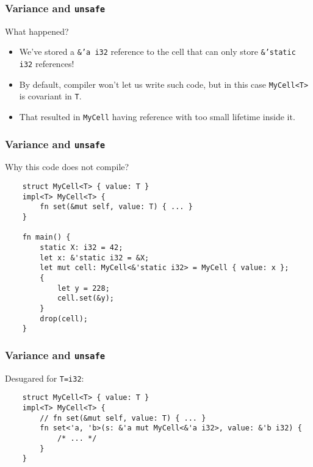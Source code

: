 \documentclass[aspectratio=1610,t]{beamer}
\begin{document}

\begin{frame}[fragile]
\frametitle{Variance and \texttt{unsafe}}
What happened?

\begin{itemize}
    \item<2-> We've stored a \texttt{\&'a i32} reference to the cell that can only store \texttt{\&'static i32} references!
    \item<3-> By default, compiler won't let us write such code, but in this case \texttt{MyCell<T>} is covariant in \texttt{T}.
    \item<4-> That resulted in \texttt{MyCell} having reference with too small lifetime inside it.
\end{itemize}
\end{frame}


\begin{frame}[fragile]
\frametitle{Variance and \texttt{unsafe}}
Why this code does not compile?

\begin{verbatim}
    struct MyCell<T> { value: T }
    impl<T> MyCell<T> {
        fn set(&mut self, value: T) { ... }
    }

    fn main() {
        static X: i32 = 42;
        let x: &'static i32 = &X;
        let mut cell: MyCell<&'static i32> = MyCell { value: x };
        {
            let y = 228;
            cell.set(&y);
        }
        drop(cell);
    }
\end{verbatim}
\end{frame}


\begin{frame}[fragile]
\frametitle{Variance and \texttt{unsafe}}
Desugared for \texttt{T=i32}:

\begin{verbatim}
    struct MyCell<T> { value: T }
    impl<T> MyCell<T> {
        // fn set(&mut self, value: T) { ... }
        fn set<'a, 'b>(s: &'a mut MyCell<&'a i32>, value: &'b i32) {
            /* ... */
        }
    }
\end{verbatim}
\end{frame}

\end{document}

